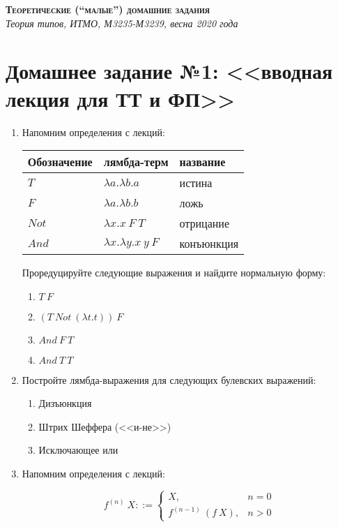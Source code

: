 \documentclass[10pt,a4paper,oneside]{article}
\begin{document}
\begin{center}{\Large\textsc{\textbf{Теоретические (``малые'') домашние задания}}}\\
             \it Теория типов, ИТМО, М3235-М3239, весна 2020 года\end{center}

\section*{Домашнее задание №1: <<вводная лекция для ТТ и ФП>>}

\begin{enumerate}

\item Напомним определения с лекций:

\begin{tabular}{lll}
Обозначение & лямбда-терм & название\\\hline
$T$ & $\lambda a.\lambda b.a$ & истина\\
$F$ & $\lambda a.\lambda b.b$ & ложь\\
$Not$ & $\lambda x.x\ F\ T$ & отрицание\\
$And$ & $\lambda x.\lambda y.x\ y\ F$ & конъюнкция
\end{tabular}

Проредуцируйте следующие выражения и найдите нормальную форму:

\begin{enumerate}
\item $T\ F$
\item $(T\ Not\ (\lambda t.t))\ F$
\item $And\ F\ T$
\item $And\ T\ T$
\end{enumerate}

\item Постройте лямбда-выражения для следующих булевских выражений:
\begin{enumerate}
\item Дизъюнкция
\item Штрих Шеффера (<<и-не>>)
\item Исключающее или
\end{enumerate}

\item Напомним определения с лекций:

$$f^{(n)}\ X ::= \left\{\begin{array}{ll} X, & n=0\\
                                f^{(n-1)}\ (f\ X), & n>0\end{array}\right.$$


\end{enumerate}
\end{document}

